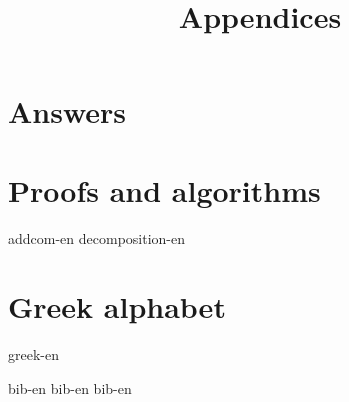 \documentclass[b5paper]{article}
\begin{document}
\title{Appendices}

\maketitle
\fi


\chapter{Answers}
\label{ch:answers}
\shipoutAnswer

\chapter{Proofs and algorithms}

{addcom-en}
{decomposition-en}

\chapter{Greek alphabet} \label{ch:greek-letters}
{greek-en}

\markboth{\bibname}{}

\begin{thebibliography}{99}
  {bib-en}
  {bib-en}
  {bib-en}
\end{thebibliography}

\ifx\wholebook\relax \else
\expandafter\enddocument
\fi
\end{document}
